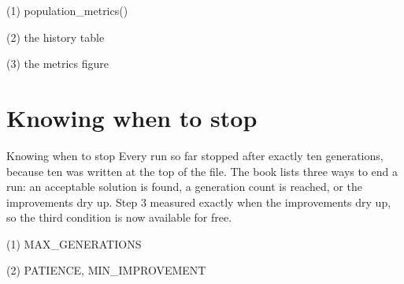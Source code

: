 \begin{frame}[fragile]{(1) population\_metrics()}

\end{frame}

\begin{frame}[fragile]{(2) the history table}

\end{frame}

\begin{frame}[fragile]{(3) the metrics figure}

\end{frame}


\section{Knowing when to stop}

\begin{frame}{Knowing when to stop}
Every run so far stopped after exactly ten generations, because ten was written
at the top of the file. The book lists three ways to end a run: an acceptable
solution is found, a generation count is reached, or the improvements dry up.
Step 3 measured exactly when the improvements dry up, so the third condition is
now available for free.
\end{frame}

\begin{frame}[fragile]{(1) MAX\_GENERATIONS}

\end{frame}

\begin{frame}[fragile]{(2) PATIENCE, MIN\_IMPROVEMENT}

\end{frame}

